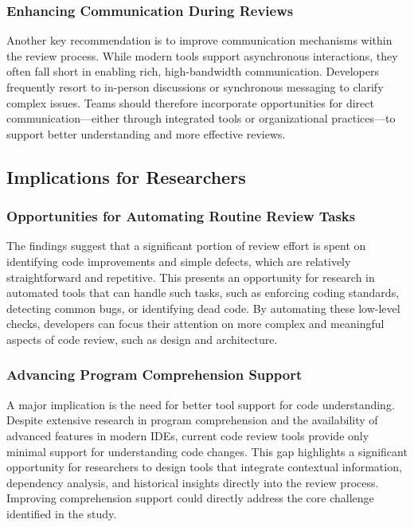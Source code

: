 \subsubsection{Enhancing Communication During Reviews}
Another key recommendation is to improve communication mechanisms within the review process. While modern tools support asynchronous interactions, they often fall short in enabling rich, high-bandwidth communication. Developers frequently resort to in-person discussions or synchronous messaging to clarify complex issues. Teams should therefore incorporate opportunities for direct communication—either through integrated tools or organizational practices—to support better understanding and more effective reviews.

\subsection{Implications for Researchers}

\subsubsection{Opportunities for Automating Routine Review Tasks}
The findings suggest that a significant portion of review effort is spent on identifying code improvements and simple defects, which are relatively straightforward and repetitive. This presents an opportunity for research in automated tools that can handle such tasks, such as enforcing coding standards, detecting common bugs, or identifying dead code. By automating these low-level checks, developers can focus their attention on more complex and meaningful aspects of code review, such as design and architecture.

\subsubsection{Advancing Program Comprehension Support}
A major implication is the need for better tool support for code understanding. Despite extensive research in program comprehension and the availability of advanced features in modern IDEs, current code review tools provide only minimal support for understanding code changes. This gap highlights a significant opportunity for researchers to design tools that integrate contextual information, dependency analysis, and historical insights directly into the review process. Improving comprehension support could directly address the core challenge identified in the study.

